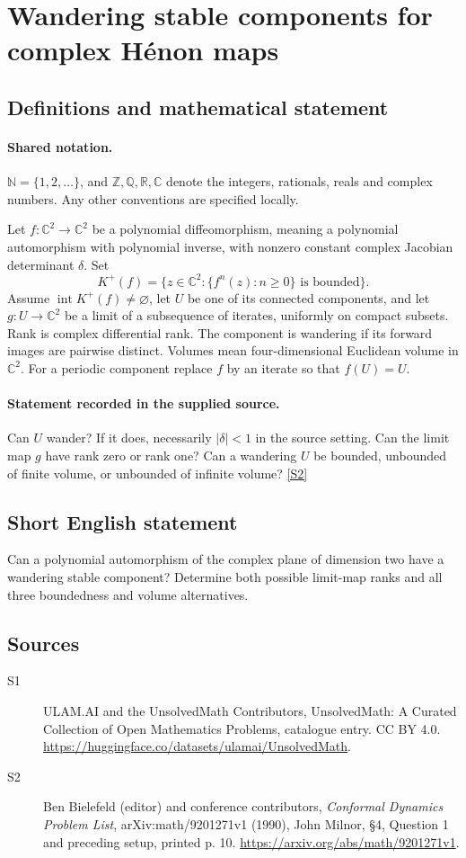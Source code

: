 \documentclass[11pt]{article}
\newcommand{\sref}[2]{\hyperlink{source:#1:#2}{[S#2]}}
\begin{document}
\section{Wandering stable components for complex Hénon maps}\label{statement}

\subsection{Definitions and mathematical statement}

\paragraph{Shared notation.}$\mathbb N=\{1,2,\ldots\}$, and $\mathbb Z,\mathbb Q,\mathbb R,\mathbb C$ denote the integers, rationals, reals and complex numbers. Any other conventions are specified locally.


Let $f:\mathbb C^2\to\mathbb C^2$ be a polynomial diffeomorphism, meaning a polynomial automorphism with polynomial inverse, with nonzero constant complex Jacobian determinant $\delta$. Set
\[K^+(f)=\{z\in\mathbb C^2:\{f^n(z):n\geq0\}\text{ is bounded}\}.\]
Assume $\operatorname{int}K^+(f)\ne\varnothing$, let $U$ be one of its connected components, and let $g:U\to\mathbb C^2$ be a limit of a subsequence of iterates, uniformly on compact subsets. Rank is complex differential rank. The component is wandering if its forward images are pairwise distinct. Volumes mean four-dimensional Euclidean volume in $\mathbb C^2$. For a periodic component replace $f$ by an iterate so that $f(U)=U$.
\paragraph{Statement recorded in the supplied source.}
Can $U$ wander? If it does, necessarily $|\delta|<1$ in the source setting. Can the limit map $g$ have rank zero or rank one? Can a wandering $U$ be bounded, unbounded of finite volume, or unbounded of infinite volume? \sref{statement}{2}
\subsection{Short English statement}
Can a polynomial automorphism of the complex plane of dimension two have a wandering stable component? Determine both possible limit-map ranks and all three boundedness and volume alternatives.
\subsection{Sources}
\begin{description}
\item[\hypertarget{source:statement:1}{S1}] ULAM.AI and the UnsolvedMath Contributors, UnsolvedMath: A Curated Collection of Open Mathematics Problems, catalogue entry. CC BY 4.0. \url{https://huggingface.co/datasets/ulamai/UnsolvedMath}.
\item[\hypertarget{source:statement:2}{S2}] Ben Bielefeld (editor) and conference contributors, \emph{Conformal Dynamics Problem List}, arXiv:math/9201271v1 (1990), John Milnor, \S4, Question 1 and preceding setup, printed p. 10. \url{https://arxiv.org/abs/math/9201271v1}.
\end{description}
\label{end:statement}
\end{document}

